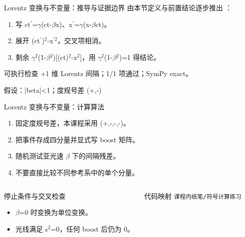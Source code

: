 \begin{frame}[t]{Lorentz 变换与不变量：推导与证据边界}
\footnotesize
{}\quad 由本节定义与前置结论逐步推出 ：
\begin{enumerate}
\item 写 ct\ensuremath{^{\prime}}=\ensuremath{\gamma}(ct-\ensuremath{\beta}x)、x\ensuremath{^{\prime}}=\ensuremath{\gamma}(x-\ensuremath{\beta}ct)。
\item 展开 (ct\ensuremath{^{\prime}})\ensuremath{^{2}}-x\ensuremath{^{\prime2}}，交叉项相消。
\item 剩余 \ensuremath{\gamma}\ensuremath{^{2}}(1-\ensuremath{\beta}\ensuremath{^{2}})[(ct)\ensuremath{^{2}}-x\ensuremath{^{2}}]，用 \ensuremath{\gamma}\ensuremath{^{2}}(1-\ensuremath{\beta}\ensuremath{^{2}})=1 得结论。
\end{enumerate}\begin{block}{可执行检查}
+1 维 Lorentz 间隔；1/1 项通过；SymPy exact。
\par\scriptsize 假设：|beta|<1；度规号差 (+,-)
\end{block}
\end{frame}

\begin{frame}[t]{Lorentz 变换与不变量：计算算法}
\footnotesize
{}\begin{enumerate}
\item 固定度规号差，本课程采用 (+,-,-,-)。
\item 把事件存成四分量并显式写 boost 矩阵。
\item 随机测试亚光速 \ensuremath{\beta} 下的间隔残差。
\item 不要直接比较不同参考系中的单个分量。
\end{enumerate}\begin{columns}[T,onlytextwidth]
\begin{block}{停止条件与交叉检查}\scriptsize\begin{itemize}
\item[\CheckMark] \ensuremath{\beta}=0 时变换为单位变换。
\item[\CheckMark] 光线满足 s\ensuremath{^{2}}=0，任何 boost 后仍为 0。
\end{itemize}\end{block}
\begin{block}{代码映射}
\scriptsize \texttt{课程内纸笔/\allowbreak{}符号计算练习}
\end{block}\end{columns}\end{frame}

